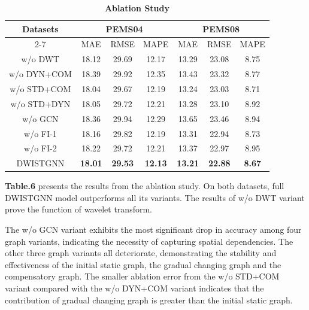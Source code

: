 \documentclass[final,12pt]{elsarticle}
\begin{document}
\begin{table}[h]  %
\label{tab-6}

  \caption{\textbf{Ablation Study}}
  \centering
  \renewcommand{\arraystretch}{1.2}

  \begin{tabular}{|*{7}{c|}}

    \hline
      \multirow{2}{*}{Datasets} 
    & \multicolumn{3}{c|}{PEMS04} 
    & \multicolumn{3}{c|}{PEMS08}  \\
    \cline{2-7}
    & MAE & RMSE & MAPE & MAE & RMSE & MAPE  \\

    \hline
    w/o DWT       & 18.12 & 29.69 & 12.17 & 13.29 & 23.08 & 8.75  \\
    \hline
    w/o DYN+COM   & 18.39 & 29.92 & 12.35 & 13.43 & 23.32 & 8.77  \\
    \hline
    w/o STD+COM   & 18.04 & 29.67 & 12.19 & 13.24 & 23.03 & 8.71  \\
    \hline
    w/o STD+DYN   & 18.05 & 29.72 & 12.21 & 13.28 & 23.10 & 8.92  \\
    \hline
    w/o GCN       & 18.36 & 29.94 & 12.29 & 13.65 & 23.46 & 8.94  \\
    \hline
    w/o FI-1      & 18.16 & 29.82 & 12.19 & 13.31 & 22.94 & 8.73  \\
    \hline
    w/o FI-2      & 18.22 & 29.72 & 12.21 & 13.37 & 22.97 & 8.95  \\
    \hline
    DWISTGNN & \textbf{18.01} 
             & \textbf{29.53} 
             & \textbf{12.13} 
             & \textbf{13.21} 
             & \textbf{22.88} 
             & \textbf{8.67}  \\
    \hline

  \end{tabular}

\end{table}


\textbf{Table.6} presents the results from the ablation study.
On both datasets, full DWISTGNN model outperforms all its variants.
The results of w/o DWT variant prove the function of wavelet transform.

The w/o GCN variant exhibits the most significant drop 
in accuracy among four graph variants, 
indicating the necessity of capturing spatial dependencies.
The other three graph variants all deteriorate, 
demonstrating the stability and effectiveness of 
the initial static graph, the gradual changing graph and the compensatory graph.
The smaller ablation error 
from the w/o STD+COM variant compared with the w/o DYN+COM variant 
indicates that the contribution of gradual changing graph is 
greater than the initial static graph.
\end{document}
